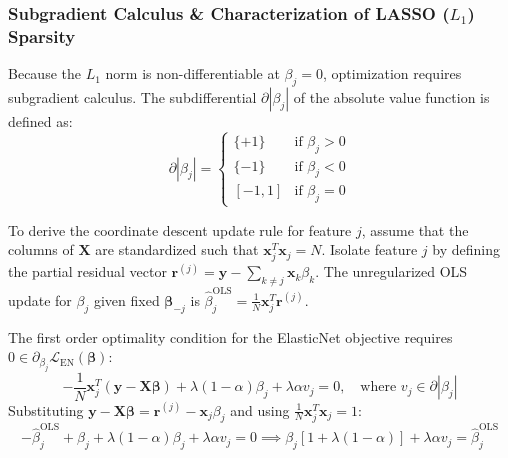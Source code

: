 \subsubsection{Subgradient Calculus \& Characterization of LASSO ($L_1$) Sparsity}
Because the $L_1$ norm is non-differentiable at $\beta_j = 0$, optimization requires subgradient calculus. The subdifferential $\partial |\beta_j|$ of the absolute value function is defined as:
\begin{equation}
\partial |\beta_j| = \begin{cases} 
\{ +1 \} & \text{if } \beta_j > 0 \\
\{ -1 \} & \text{if } \beta_j < 0 \\
[-1, 1] & \text{if } \beta_j = 0 
\end{cases}
\label{eq:ch4_subgradient_l1}
\end{equation}

To derive the coordinate descent update rule for feature $j$, assume that the columns of $\mathbf{X}$ are standardized such that $\mathbf{x}_j^T \mathbf{x}_j = N$. Isolate feature $j$ by defining the partial residual vector $\mathbf{r}^{(j)} = \mathbf{y} - \sum_{k \neq j} \mathbf{x}_k \beta_k$. The unregularized OLS update for $\beta_j$ given fixed $\boldsymbol{\beta}_{-j}$ is $\hat{\beta}_j^{\text{OLS}} = \frac{1}{N} \mathbf{x}_j^T \mathbf{r}^{(j)}$.

The first order optimality condition for the ElasticNet objective requires $0 \in \partial_{\beta_j} \mathcal{L}_{\text{EN}}(\boldsymbol{\beta})$:
\begin{equation}
-\frac{1}{N} \mathbf{x}_j^T (\mathbf{y} - \mathbf{X}\boldsymbol{\beta}) + \lambda(1-\alpha)\beta_j + \lambda \alpha v_j = 0, \quad \text{where } v_j \in \partial |\beta_j|
\end{equation}
Substituting $\mathbf{y} - \mathbf{X}\boldsymbol{\beta} = \mathbf{r}^{(j)} - \mathbf{x}_j \beta_j$ and using $\frac{1}{N}\mathbf{x}_j^T \mathbf{x}_j = 1$:
\begin{equation}
-\hat{\beta}_j^{\text{OLS}} + \beta_j + \lambda(1-\alpha)\beta_j + \lambda \alpha v_j = 0 \implies \beta_j [ 1 + \lambda(1-\alpha) ] + \lambda \alpha v_j = \hat{\beta}_j^{\text{OLS}}
\label{eq:ch4_opt_condition}
\end{equation}

